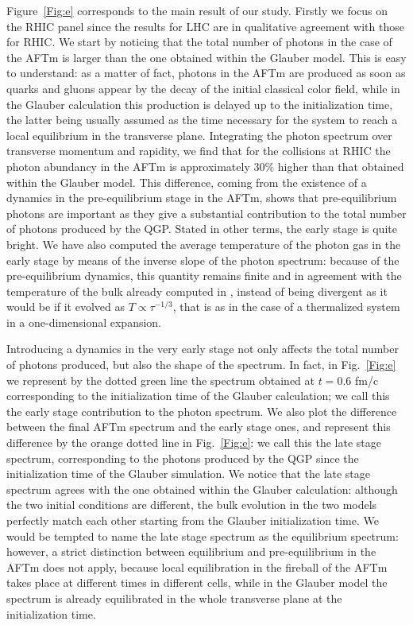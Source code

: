 \documentclass[aps,prc,a4paper,nofootinbib,
preprintnumbers,superscriptaddress,twocolumn,showpacs,showkeys]{revtex4}
\begin{document}
Figure~\ref{Fig:e} corresponds to the main result of our study. Firstly we focus on the RHIC panel
since the results for LHC are in qualitative agreement with those for RHIC.
We start by noticing that the total number of photons in the case of the AFTm is larger than the
one obtained within the Glauber model. This is easy to understand: as a matter of fact,
photons in the AFTm are produced as soon as quarks and gluons appear by the decay
of the initial classical color field, while in the Glauber calculation this production is delayed up to 
the initialization time, the latter being usually assumed as the time necessary for the system to reach
a local equilibrium in the transverse plane. Integrating the photon spectrum over transverse
momentum and rapidity, we find that for the collisions at RHIC the photon abundancy in the AFTm
is approximately $30\%$ higher than that obtained within the Glauber model.
This difference, coming from the existence of a dynamics in the pre-equilibrium stage in the AFTm,
shows that pre-equilibrium photons are important as they give a substantial contribution to the total
number of photons produced by the QGP. Stated in other terms, the early stage is quite bright.
We have also computed the average temperature of the photon gas in the early stage
by means of the inverse slope of the photon spectrum: 
because of the pre-equilibrium dynamics, this quantity remains finite and in agreement with
the temperature of the bulk already computed in \cite{Ruggieri:2015yea}, 
instead of being divergent as it would be if it evolved as $T\propto\tau^{-1/3}$, 
that is as in the case of a thermalized system in a one-dimensional expansion.




Introducing a dynamics in the very early stage not only affects the total number of photons produced,
but also the shape of the spectrum.
In fact, in Fig.~\ref{Fig:e} we represent by the dotted green line the spectrum 
obtained at $t=0.6$ fm/c corresponding to the initialization time of the Glauber calculation;
we call this the early stage contribution to the photon spectrum.
We also plot the difference between the final AFTm spectrum and the early stage ones,
and represent this difference by the orange dotted line in Fig.~\ref{Fig:e}: we call this 
the late stage spectrum, corresponding to the photons produced by the QGP
since the initialization time of the Glauber simulation.
We notice that the late stage spectrum agrees with the one obtained
within the Glauber calculation: although the two initial conditions are different, 
the bulk evolution in the two models perfectly match each other starting from the
Glauber initialization time.
We would be tempted to name the late stage spectrum as the equilibrium  
spectrum: however, a strict distinction between equilibrium and pre-equilibrium
in the AFTm does not apply, because local equilibration in the fireball of the AFTm
takes place at different times in different cells, while in the Glauber model 
the spectrum is already equilibrated in the whole transverse plane at the initialization time.
 
\end{document}
